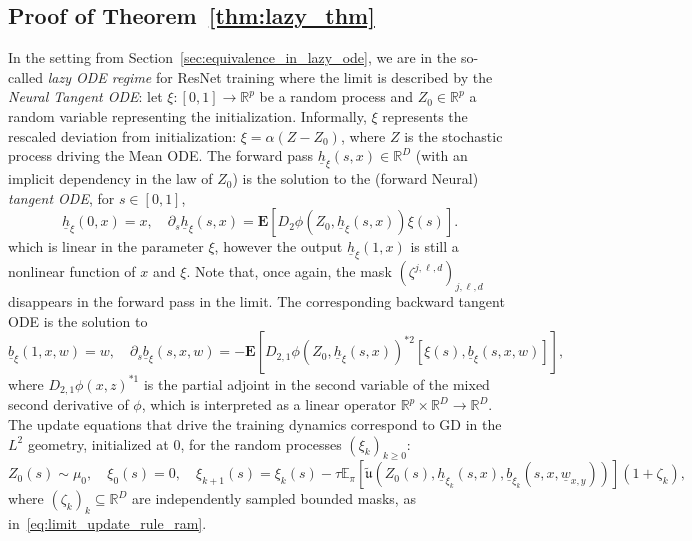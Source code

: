 \documentclass[a4paper,11pt]{article}
\newcommand{\R}{\mathbb{R}}
\newcommand{\1}{\mathbbm{1}}
\newcommand{\E}{\mathbb{E}}
\theoremstyle{definition}
\theoremstyle{remark}
\begin{document}
\subsection{Proof of Theorem~\ref{thm:lazy_thm}}\label{app:proof_lazy_thm}
In the setting from Section~\ref{sec:equivalence_in_lazy_ode}, we are in the so-called \emph{lazy ODE regime} for ResNet training where the limit is described by the \emph{Neural Tangent ODE}: let $\xi:[0,1]\to\R^p$ be a random process and $Z_0\in \R^p$ a random variable representing the initialization. Informally, $\xi$ represents the rescaled deviation from initialization: $\xi = \alpha(Z-Z_0)$, where $Z$ is the stochastic process driving the Mean ODE. 
The forward pass $\underline{h}_\xi(s, x) \in \mathbb{R}^D$ (with an implicit dependency in the law of $Z_0$) is the solution to the (forward Neural) \emph{tangent ODE}, for $s\in[0,1]$,
\begin{equation}\label{eq:forward_tangent_ode}
    \underline{h}_\xi(0, x) = x, \quad \partial_s \underline{h}_\xi(s, x) = \mathbf{E}[D_2 \phi(Z_0,\underline{h}_\xi(s, x)) \xi(s)].
\end{equation}
which is linear in the parameter $\xi$, however the output $\underline{h}_\xi(1, x)$ is still a nonlinear function of $x$ and $\xi$. Note that, once again, the mask $(\zeta^{j,\ell, d})_{j,\ell, d}$ disappears in the forward pass in the limit.
The corresponding backward tangent ODE is the solution to
\begin{equation}\label{eq:backward_tangent_ode}
\underline{b}_\xi(1, x, w) = w,\quad \partial_s \underline{b}_\xi(s, x, w) = -\mathbf{E}\left[ D_{2,1} \phi(Z_0,\underline{h}_\xi(s, x))^{*2} [\xi(s), \underline{b}_\xi(s, x, w)] \right],   
\end{equation}
where $D_{2,1} \phi(x, z)^{*1}$ is the partial adjoint in the second variable of the mixed second derivative of $\phi$, which is interpreted as a linear operator $\mathbb{R}^p\times\mathbb{R}^D \to \mathbb{R}^D$. The update equations that drive the training dynamics correspond to GD in the $L^2$ geometry, initialized at 0, for the random processes $(\xi_k)_{k \geq 0}$:
\begin{equation}\label{eq:update_lazy_regime}
    Z_0(s) \sim \mu_0, \quad \xi_0(s) = 0, \quad \xi_{k+1}(s) = \xi_k(s) - \tau \E_{\pi}[\tilde{\mathfrak{u}}(Z_0(s), \underline{h}_{\xi_k}(s,x), \underline{b}_{\xi_k}(s,x,\underline{w}_{x,y}))](1+\zeta_k),
\end{equation}
where $(\zeta_k)_k \subseteq\R^D$ are independently sampled 
{bounded} masks, as in~\eqref{eq:limit_update_rule_ram}.
\end{document}
